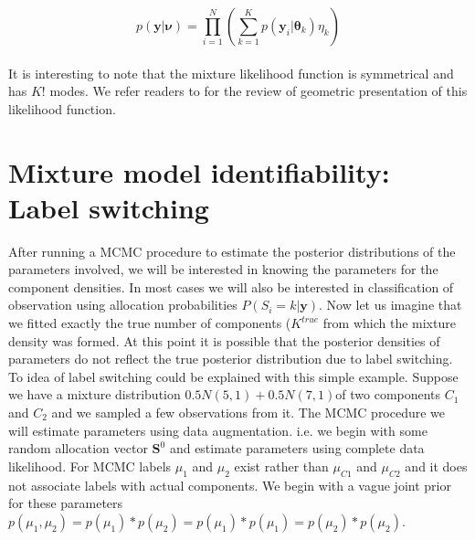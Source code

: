 $$p(\boldsymbol{y}|\boldsymbol{\nu}) = \prod_{i=1}^{N} (\sum_{k=1}^{K} p(\boldsymbol{y}_i | \boldsymbol{\theta}_k) \eta_k)$$\\

It is interesting to note that the mixture likelihood function is symmetrical and has $K!$ modes. We refer readers to \citet[pg. 45-46]{fruhwirth-schnatter_finite_2013} for the review of geometric presentation of this likelihood function.\\

\section{Mixture model identifiability: Label switching}
After running a MCMC procedure to estimate the posterior distributions of the parameters involved, we will be interested in knowing the parameters for the component densities. In most cases we will also be interested in classification of observation using allocation probabilities $P(S_i = k | \boldsymbol{y})$. Now let us imagine that we fitted exactly the true number of components ($K^{true}$ from which the mixture density was formed. At this point it is possible that the posterior densities of parameters do not reflect the true posterior distribution due to label switching.\\

To idea of label switching could be explained with this simple example. Suppose we have a mixture distribution $0.5N(5,1) + 0.5N(7,1)$of two components $C_1$ and $C_2$ and we sampled a few observations from it. The MCMC procedure we will estimate parameters using data augmentation. i.e. we begin with some random allocation vector $\boldsymbol{S}^0$ and estimate parameters using complete data likelihood. For MCMC labels $\mu_1$ and $\mu_2$ exist rather than  $\mu_{C1}$ and $\mu_{C2}$ and it does not associate labels with actual components. We begin with a vague joint prior for these parameters $p(\mu_1, \mu_2) = p(\mu_1)*p(\mu_2) = p(\mu_1)*p(\mu_1) = p(\mu_2)*p(\mu_2)$.\\

